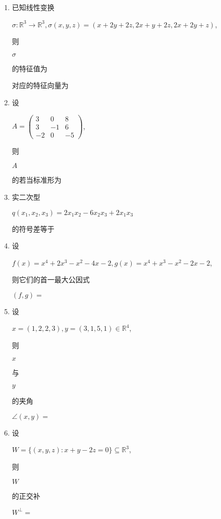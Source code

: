 \documentclass[10pt]{article}
\begin{document}
\begin{enumerate}
  \item \begin{CJK}{UTF8}{mj}已知线性变换\end{CJK} $\sigma: \mathbb{R}^{3} \rightarrow \mathbb{R}^{3}, \sigma(x, y, z)=(x+2 y+2 z, 2 x+y+2 z, 2 x+2 y+z)$, \begin{CJK}{UTF8}{mj}则\end{CJK} $\sigma$ \begin{CJK}{UTF8}{mj}的特征值为\end{CJK} \begin{CJK}{UTF8}{mj}对应的特征向量为\end{CJK}

  \item \begin{CJK}{UTF8}{mj}设\end{CJK} $A=\left(\begin{array}{ccc}3 & 0 & 8 \\ 3 & -1 & 6 \\ -2 & 0 & -5\end{array}\right)$, \begin{CJK}{UTF8}{mj}则\end{CJK} $A$ \begin{CJK}{UTF8}{mj}的若当标准形为\end{CJK}

  \item \begin{CJK}{UTF8}{mj}实二次型\end{CJK} $q\left(x_{1}, x_{2}, x_{3}\right)=2 x_{1} x_{2}-6 x_{2} x_{3}+2 x_{1} x_{3}$ \begin{CJK}{UTF8}{mj}的符号差等于\end{CJK}

  \item \begin{CJK}{UTF8}{mj}设\end{CJK} $f(x)=x^{4}+2 x^{3}-x^{2}-4 x-2, g(x)=x^{4}+x^{3}-x^{2}-2 x-2$, \begin{CJK}{UTF8}{mj}则它们的首一最大公因式\end{CJK} $(f, g)=$

  \item \begin{CJK}{UTF8}{mj}设\end{CJK} $x=(1,2,2,3), y=(3,1,5,1) \in \mathbb{R}^{4}$, \begin{CJK}{UTF8}{mj}则\end{CJK} $x$ \begin{CJK}{UTF8}{mj}与\end{CJK} $y$ \begin{CJK}{UTF8}{mj}的夹角\end{CJK} $\angle(x, y)=$

  \item \begin{CJK}{UTF8}{mj}设\end{CJK} $W=\{(x, y, z): x+y-2 z=0\} \subseteq \mathbb{R}^{3}$, \begin{CJK}{UTF8}{mj}则\end{CJK} $W$ \begin{CJK}{UTF8}{mj}的正交补\end{CJK} $W^{\perp}=$

\end{enumerate}
\end{document}
